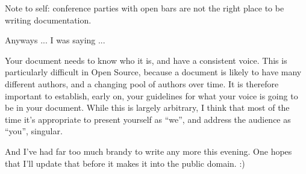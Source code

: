 Note to self: conference parties with open bars are not the right place
to be writing documentation.

Anyways ... I was saying ...

Your document needs to know who it is, and have a consistent voice. This
is particularly difficult in Open Source, because a document is likely
to have many different authors, and a changing pool of authors over
time. It is therefore important to establish, early on, your guidelines
for what your voice is going to be in your document. While this is
largely arbitrary, I think that most of the time it's appropriate to
present yourself as ``we'', and address the audience as ``you'',
singular.

And I've had far too much brandy to write any more this evening. One
hopes that I'll update that before it makes it into the public domain.
:)




